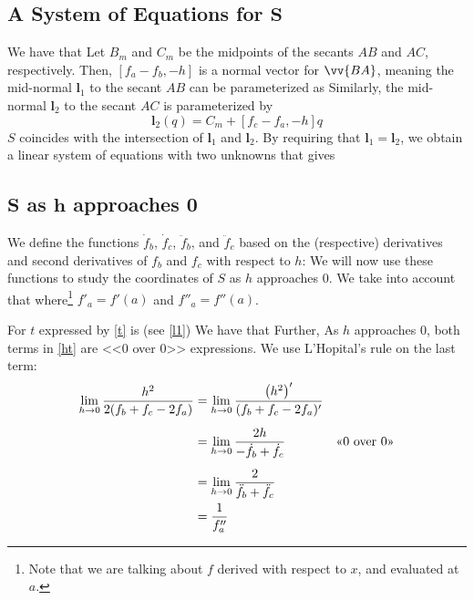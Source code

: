 \subsection*{A System of Equations for $\bm S $}
We have that
Let $ B_m $ and $ C_m $ be the midpoints of the secants $ AB $ and $ AC $, respectively. Then,
$ [f_a-f_b,-h] $ is a normal vector for $ \vv{BA} $, meaning the mid-normal $\bm l_1 $ to the secant $ AB $ can be parameterized as
Similarly, the mid-normal $\bm l_2 $ to the secant $ AC $ is parameterized by
\[ {\bm l_2(q)}=C_m+[f_c-f_a, -h]q \]
$ S $ coincides with the intersection of $\bm l_1 $ and $\bm l_2 $.
By requiring that $\bm l_1= \bm l_2 $, we obtain a linear system of equations with two unknowns that gives
\subsection*{$\bm S$ as $\bm {h}$ approaches 0}
We define the functions $ \dot{f}_b$, $ \dot{f}_c  $, $ \ddot{f}_b $, and $ \ddot{f}_c $ based on the (respective) derivatives and second derivatives of $ f_b $ and $ f_c $ with respect to $ h $:
We will now use these functions to study the coordinates of $ S $ as $ h $ approaches 0. We take into account that
where\footnote{Note that we are talking about $ f $ derived with respect to $ x $, and evaluated at $ a $.} $ f'_a=f'(a) $ and $ f''_a=f''(a) $. \vsk

For $ t $ expressed by \eqref{t} is (see \eqref{l1})
We have that
Further,
As $ h $ approaches 0, both terms in \eqref{ht} are <<0 over 0>> expressions. We use L'Hopital's rule on the last term: 
\begin{align}
	&&\lim\limits_{h\to0}\frac{h^2}{2(f_b+f_c-2f_a)}&=\lim\limits_{h\to0}\frac{\left(h^2\right)'}{(f_b+f_c-2f_a)'} \br
	&&&=\lim\limits_{h\to0} \frac{2h}{-\dot{f}_b+\dot{f}_c} &&\text{<<0 over 0>>}\br
	&&&=\lim\limits_{h\to0} \frac{2}{\ddot{f}_b+\ddot{f}_c}  \\
	&& &=\frac{1}{f_a''} \label{ht2}
\end{align}

